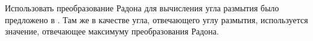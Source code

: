 \par

Использовать преобразование Радона для вычисления угла размытия было предложено в \cite{moghaddam}. 
Там же в качестве угла, отвечающего углу размытия, используется значение, отвечающее максимуму преобразования Радона. 

\begin{figure}[H]
\begin{minipage}[h]{0.32\linewidth}
\end{minipage}
\hfill
\begin{minipage}[h]{0.32\linewidth}

\end{minipage}
\end{figure}
